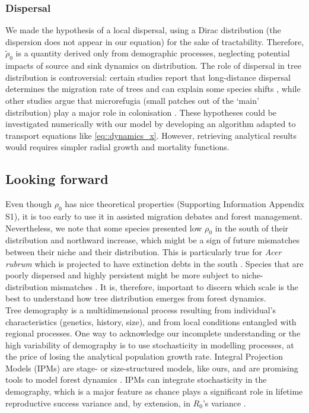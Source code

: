 \subsubsection{Dispersal}
We made the hypothesis of a local dispersal, using a Dirac distribution (\ie the dispersion does not appear in our equation) for the sake of tractability. Therefore, $ \tilde \rho_0 $ is a quantity derived only from demographic processes, neglecting potential impacts of source and sink dynamics on distribution. The role of dispersal in tree distribution is controversial: certain studies report that long-distance dispersal determines the migration rate of trees and can explain some species shifts \citep[and references therein]{Nathan2002}, while other studies argue that microrefugia (small patches out of the `main' distribution) play a major role in colonisation \citep[and references therein]{Feurdean2013}. These hypotheses could be investigated numerically with our model by developing an algorithm adapted to transport equations like \eqref{eq::dynamics_x}. However, retrieving analytical results would requires simpler radial growth and mortality functions.

\subsection{Looking forward}
Even though $ \rho_0 $ has nice theoretical properties (Supporting Information Appendix S1), it is too early to use it in assisted migration debates and forest management. Nevertheless, we note that some species presented low $ \rho_0 $ in the south of their distribution and northward increase, which might be a sign of future mismatches between their niche and their distribution. This is particularly true for \textit{Acer rubrum} which is projected to have extinction debts in the south \citep{Talluto2017a}. Species that are poorly dispersed and highly persistent might be more subject to niche-distribution mismatches \citep[study on shrubs of the Proteaceae family in South Africa, not on trees]{Pagel2020}. It is, therefore, important to discern which scale is the best to understand how tree distribution emerges from forest dynamics. \\

Tree demography is a multidimensional process resulting from individual's characteristics (\eg genetics, history, size), and from local conditions entangled with regional processes. One way to acknowledge our incomplete understanding or the high variability of demography is to use stochasticity in modelling processes, at the price of losing the analytical population growth rate. Integral Projection Models (IPMs) are stage- or size-structured models, like ours, and are promising tools to model forest dynamics \citep{Vindenes2012, Kunstler2019, Merow2014}. IPMs can integrate stochasticity in the demography, which is a major feature as chance plays a significant role in lifetime reproductive success variance and, by extension, in $ R_0 $'s variance \citep{Snyder2016, Snyder2018}.

